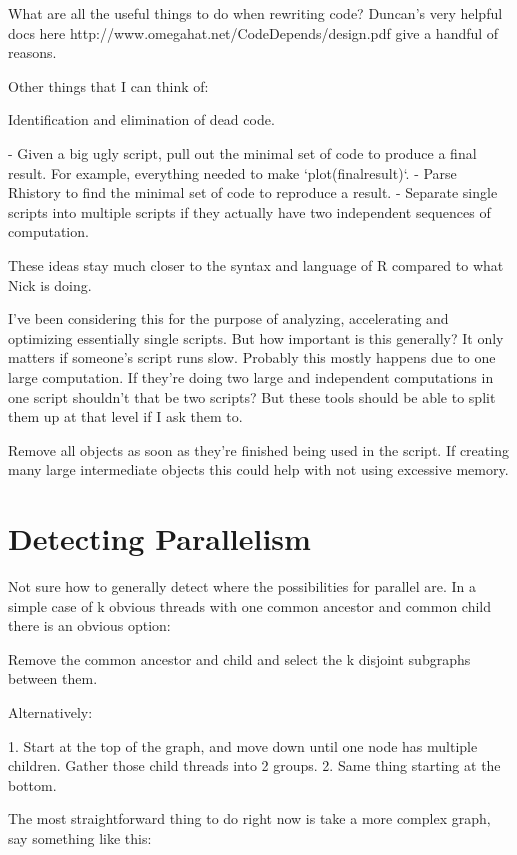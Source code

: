 \documentclass[12pt]{article}
\begin{document}
What are all the useful things to do when rewriting code?  Duncan's very
helpful docs here http://www.omegahat.net/CodeDepends/design.pdf give a
handful of reasons.

Other things that I can think of:

Identification and elimination of dead code.

- Given a big ugly script, pull out the minimal set of code to produce a
  final result. For example, everything needed to make `plot(finalresult)`.
- Parse Rhistory to find the minimal set of code to reproduce a result.
- Separate single scripts into multiple scripts if they actually have two
  independent sequences of computation.

These ideas stay much closer to the syntax and language of R compared to
what Nick is doing.

I've been considering this for the purpose of analyzing, accelerating and
optimizing essentially single scripts. But how important is this generally?
It only matters if someone's script runs slow. Probably this mostly happens
due to one large computation. If they're doing two large and independent
computations in one script shouldn't that be two scripts? But these tools
should be able to split them up at that level if I ask them to.

Remove all objects as soon as they're finished being used in the script. If
creating many large intermediate objects this could help with not using
excessive memory.

\section{Detecting Parallelism}

Not sure how to generally detect where the possibilities for
parallel are. In a simple case of k obvious threads with one common
ancestor and common child there is an obvious option:

Remove the common ancestor and child and select the k disjoint subgraphs
between them.

Alternatively:

1. Start at the top of the graph, and move down until one node has
multiple children. Gather those child threads into 2 groups.
2. Same thing starting at the bottom.

The most straightforward thing to do right now is take a more complex
graph, say something like this:
\end{document}
